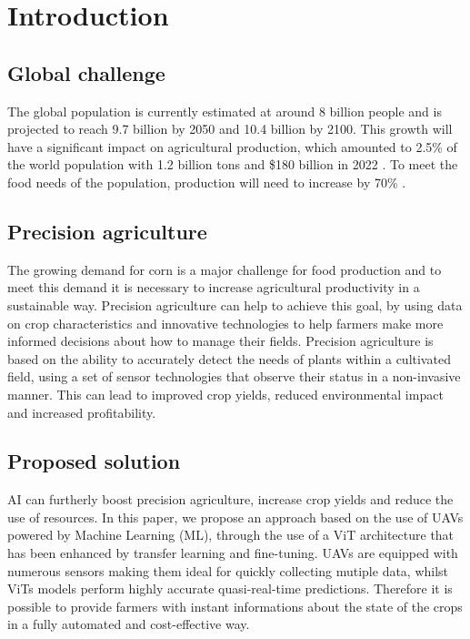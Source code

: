 \section{Introduction}
\label{sec:introduction}

\subsection{Global challenge}

The global population is currently estimated at around 8 billion people and is projected to reach 9.7 billion by 2050 and 10.4 billion by 2100.
This growth will have a significant impact on agricultural production, which amounted to 2.5\% of the world population with 1.2 billion tons and \$180 billion in 2022 \cite{fao2023}.
To meet the food needs of the population, production will need to increase by 70\% \cite{unpd22}.

\subsection{Precision agriculture}

The growing demand for corn is a major challenge for food production and to meet this demand it is necessary to increase agricultural productivity in a sustainable way.
Precision agriculture can help to achieve this goal, by using data on crop characteristics and innovative technologies to help farmers make more informed decisions about how to manage their fields.
Precision agriculture is based on the ability to accurately detect the needs of plants within a cultivated field, using a set of sensor technologies that observe their status in a non-invasive manner. 
This can lead to improved crop yields, reduced environmental impact and increased profitability.

\subsection{Proposed solution}

AI can furtherly boost precision agriculture, increase crop yields and reduce the use of resources.
In this paper, we propose an approach based on the use of UAVs powered by Machine Learning (ML), through the use of a ViT architecture that has been enhanced by transfer learning and fine-tuning.
UAVs are equipped with numerous sensors making them ideal for quickly collecting mutiple data, whilst ViTs models perform highly accurate quasi-real-time predictions.
Therefore it is possible to provide farmers with instant informations about the state of the crops in a fully automated and cost-effective way.